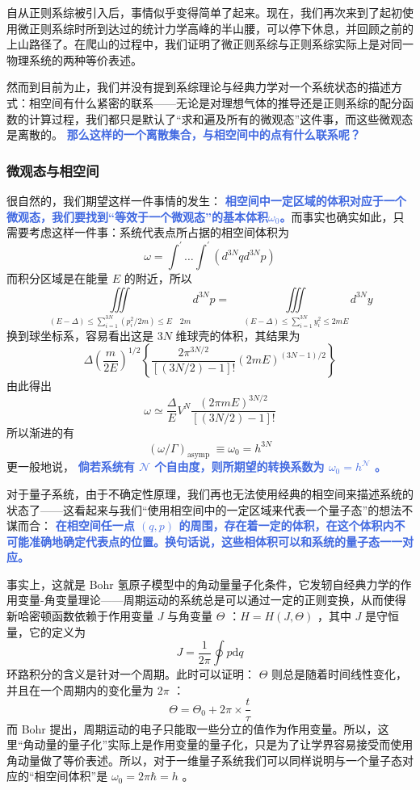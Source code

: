 \documentclass[hyperref,UTF-8]{ctexart}
\newcommand{\0}{\boldsymbol{0}}
\begin{document}
自从正则系综被引入后，事情似乎变得简单了起来。现在，我们再次来到了起初使用微正则系综时所到达过的统计力学高峰的半山腰，可以停下休息，并回顾之前的上山路径了。在爬山的过程中，我们证明了微正则系综与正则系综实际上是对同一物理系统的两种等价表述。

然而到目前为止，我们并没有提到系综理论与经典力学对一个系统状态的描述方式：相空间有什么紧密的联系——无论是对理想气体的推导还是正则系综的配分函数的计算过程，我们都只是默认了“求和遍及所有的微观态”这件事，而这些微观态是离散的。 \textcolor{RoyalBlue}{\textbf{\kaishu 那么这样的一个离散集合，与相空间中的点有什么联系呢？}}

\subsubsection{微观态与相空间}

很自然的，我们期望这样一件事情的发生： \textcolor{RoyalBlue}{\textbf{\kaishu 相空间中一定区域的体积对应于一个微观态，我们要找到“等效于一个微观态”的基本体积$\omega_0$。}}而事实也确实如此，只需要考虑这样一件事：系统代表点所占据的相空间体积为
\begin{equation}
    \omega=\int^{\prime} \ldots \int^{\prime}\left(d^{3 N} q d^{3 N} p\right)
\end{equation}
而积分区域是在能量 $E$ 的附近，所以
\[
    \iiint\limits_{(E-\Delta) \leq \sum_{i=1}^{3 N}\left(p_i^2 / 2 m\right) \leq E \quad 2 m} d^{3 N} p=\quad \iiint\limits_{(E-\Delta) \leq \sum_{i=1}^{3 N} y_i^2 \leq 2 m E
    } d^{3 N} y
\]
换到球坐标系，容易看出这是 $3N$ 维球壳的体积，其结果为
\[
    \Delta\left(\frac{m}{2 E}\right)^{1 / 2}\left\{\frac{2 \pi^{3 N / 2}}{[(3 N / 2)-1] !}(2 m E)^{(3 N-1) / 2}\right\}
\]
由此得出
\[
    \omega \simeq \frac{\Delta}{E} V^N \frac{(2 \pi m E)^{3 N / 2}}{[(3 N / 2)-1] !}
\]
所以渐进的有
\begin{equation}
    (\omega / \Gamma)_{\text {asymp }} \equiv \omega_0=h^{3 N}
\end{equation}
更一般地说， \textcolor{RoyalBlue}{\textbf{\kaishu 倘若系统有 $\mathcal{N}$ 个自由度，则所期望的转换系数为 $\omega_0 = h^{\mathcal{N}}$ 。}}

对于量子系统，由于不确定性原理，我们再也无法使用经典的相空间来描述系统的状态了——这看起来与我们“使用相空间中的一定区域来代表一个量子态”的想法不谋而合： \textcolor{RoyalBlue}{\textbf{\kaishu  在相空间任一点 $(q,p)$ 的周围，存在着一定的体积，在这个体积内不可能准确地确定代表点的位置。换句话说，这些相体积可以和系统的量子态一一对应。}}

事实上，这就是 Bohr 氢原子模型中的角动量量子化条件，它发轫自经典力学的作用变量-角变量理论——周期运动的系统总是可以通过一定的正则变换，从而使得新哈密顿函数依赖于作用变量 $J$ 与角变量 $\Theta$ ：$H = H(J,\Theta)$ ，其中 $J$ 是守恒量，它的定义为
\[
    J = \frac{1}{2\pi} \oint p\mathrm{d}q
\]
环路积分的含义是针对一个周期。此时可以证明： $\Theta$ 则总是随着时间线性变化，并且在一个周期内的变化量为 $2\pi$ ：
\[
    \Theta = \Theta_0 + 2\pi \times \frac{t}{\tau} 
\]
而 Bohr 提出，周期运动的电子只能取一些分立的值作为作用变量。所以，这里“角动量的量子化”实际上是作用变量的量子化，只是为了让学界容易接受而使用角动量做了等价表述。所以，对于一维量子系统我们可以同样说明与一个量子态对应的“相空间体积”是 $\omega_0 = 2\pi \hbar = h$ 。
\end{document}
